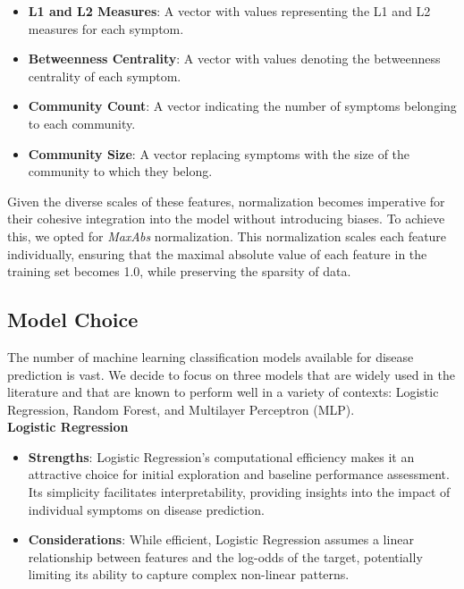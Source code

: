 \begin{itemize}
	\setlength\itemsep{1em} %
	\item \textbf{L1 and L2 Measures}: A vector with values representing the L1 and L2 measures for each symptom.
	\item \textbf{Betweenness Centrality}: A vector with values denoting the betweenness centrality of each symptom.
	\item \textbf{Community Count}: A vector indicating the number of symptoms belonging to each community.
	\item \textbf{Community Size}: A vector replacing symptoms with the size of the community to which they belong.
\end{itemize}
\noindent
Given the diverse scales of these features, normalization becomes imperative for their cohesive integration into the model
without introducing biases. To achieve this, we opted for \textit{MaxAbs} normalization. This normalization scales each feature
individually, ensuring that the maximal absolute value of each feature in the training set becomes 1.0, while preserving the sparsity of data.



\subsection{Model Choice}
The number of machine learning classification models available for disease prediction is vast. We decide to focus on three models
that are widely used in the literature and that are known to perform well in a variety of contexts: Logistic Regression, Random Forest, and Multilayer Perceptron (MLP).\\

\noindent
\textbf{Logistic Regression}\vspace{0.15cm}
\begin{itemize}
	\item \textbf{Strengths}: Logistic Regression's computational efficiency makes it an attractive choice for initial exploration and
	      baseline performance assessment. Its simplicity facilitates interpretability, providing insights into the impact of individual symptoms on disease prediction.
	\item \textbf{Considerations}: While efficient, Logistic Regression assumes a linear relationship between features and the
	      log-odds of the target, potentially limiting its ability to capture complex non-linear patterns.
\end{itemize}

